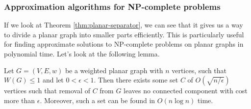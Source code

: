 \subsubsection{Approximation algorithms for NP-complete problems}
If we look at Theorem \ref{thm:planar-separator}, we can see that it
gives us a way to divide a planar graph into smaller parts efficiently.
This is particularly useful for finding approximate solutions to NP-complete
problems on planar graphs in polynomial time. Let's look at the following
lemma.
\begin{lemma} \cite{chibaApplicationsLiptonTarjans1981} \label{lem:epsilon-planar-separator}
	Let $G = (V, E, w)$ be a weighted planar graph with $n$ vertices, such that
    $W(G) \leq 1$ and let $0 < \epsilon < 1$. Then
	there exists some set $C$ of $O(\sqrt{n/ \epsilon})$ vertices such that
	removal of $C$ from $G$ leaves no connected component with cost
	more than $\epsilon$. Moreover, such a set can be found in $O(n\log n)$ time.
\end{lemma}
